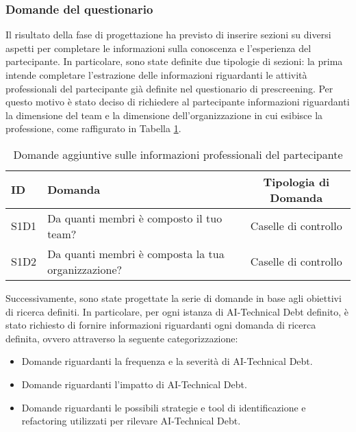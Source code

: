 \subsubsection{Domande del questionario}

Il risultato della fase di progettazione ha previsto di inserire sezioni su diversi aspetti per completare le informazioni sulla conoscenza e l'esperienza del partecipante.
In particolare, sono state definite due tipologie di sezioni: la prima intende completare l'estrazione delle informazioni riguardanti le attività professionali del partecipante già definite nel questionario di prescreening. Per questo motivo è stato deciso di richiedere al partecipante informazioni riguardanti la dimensione del team e la dimensione dell'organizzazione in cui esibisce la professione, come raffigurato in Tabella \ref{tab:info_prof_add}.

\begin{table}[h]
    \centering
    \begin{tabular}{|l|p{6.8cm}|c|}
        \hline
        \textbf{ID} & \textbf{Domanda} & \textbf{Tipologia di Domanda}\\
        \hline
        S1D1 & Da quanti membri è composto il tuo team?  & Caselle di controllo\\
        \hline
        S1D2 & Da quanti membri è composta la tua organizzazione?  & Caselle di controllo\\
        \hline
    \end{tabular}
    \caption{Domande aggiuntive sulle informazioni professionali del partecipante}
    \label{tab:info_prof_add}
\end{table}

Successivamente, sono state progettate la serie di domande in base agli obiettivi di ricerca definiti.
In particolare, per ogni istanza di AI-Technical Debt definito, è stato richiesto di fornire informazioni riguardanti ogni domanda di ricerca definita, ovvero attraverso la seguente categorizzazione:
\begin{itemize}
    \item Domande riguardanti la frequenza e la severità di AI-Technical Debt.
    \item Domande riguardanti l'impatto di AI-Technical Debt.
    \item Domande riguardanti le possibili strategie e tool di identificazione e refactoring utilizzati per rilevare AI-Technical Debt.
\end{itemize}

